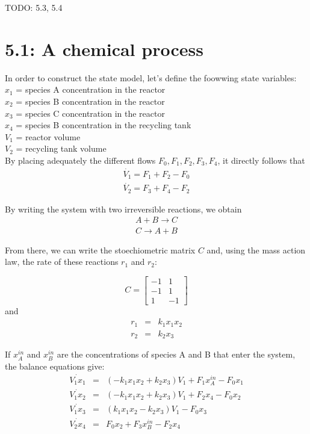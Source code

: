 TODO: 5.3, 5.4

\section*{5.1: A chemical process}

In order to construct the state model, let's define the foowwing state variables:\\
\indent $x_1$ = species A concentration in the reactor\\
\indent $x_2$ = species B concentration in the reactor\\
\indent $x_3$ = species C concentration in the reactor\\
\indent $x_4$ = species B concentration in the recycling tank\\
\indent $V_1$ = reactor volume\\
\indent $V_2$ = recycling tank volume\\

By placing adequately the different flows $F_0, F_1, F_2, F_3, F_4$, it directly follows that
\begin{eqnarray*}
\dot{V_1} = F_1+F_2-F_0\\
\dot{V_2} = F_3+F_4-F_2
\end{eqnarray*}

By writing the system with two irreversible reactions, we obtain
\begin{eqnarray*}
A+B\rightarrow C \\
C\rightarrow A+B
\end{eqnarray*}

From there, we can write the stoechiometric matrix $C$ and, using the mass action law, the rate of these reactions $r_1$ and $r_2$:

\begin{equation*}
C = \begin{bmatrix}
-1 & 1\\
-1 & 1\\
1 & -1
\end{bmatrix}
\end{equation*}
and
\begin{eqnarray*}
r_1 &=& k_1 x_1 x_2\\
r_2 &=& k_2 x_3 
\end{eqnarray*}


If $x_A^{in}$ and $x_B^{in}$ are the concentrations of species A and B that enter the system, the balance equations give:
\begin{eqnarray*}
\dot{V_1x_1} &=& (-k_1 x_1 x_2+k_2 x_3 )V_1 + F_1 x_A^{in} - F_0 x_1 \\
\dot{V_1x_2} &=& (-k_1 x_1 x_2+k_2 x_3 )V_1 + F_2 x_4 - F_0 x_2 \\
\dot{V_1x_3} &=& (k_1 x_1 x_2-k_2 x_3 )V_1  - F_0 x_3 \\
\dot{V_2x_4} &=& F_0 x_2 + F_3 x_B^{in} - F_2 x_4
\end{eqnarray*}

